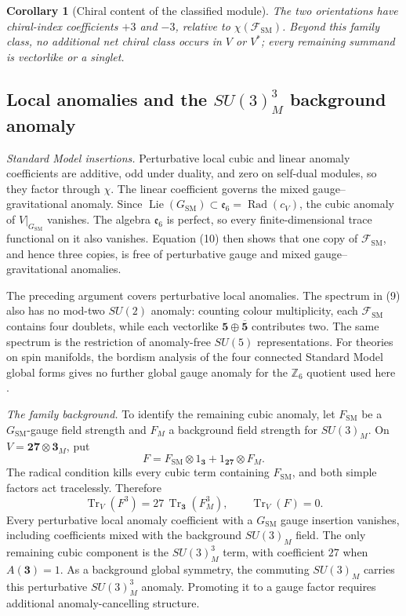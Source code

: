 \documentclass[11pt]{article}
\newtheorem{corollary}[theorem]{Corollary}
\theoremstyle{remark}
\newcommand{\e}{\mathfrak e}
\newcommand{\Tr}{\operatorname{Tr}}
\newcommand{\Rad}{\operatorname{Rad}}
\newcommand{\Ksm}{G_{\mathrm{SM}}}
\begin{document}
\begin{corollary}[Chiral content of the classified module]
\label{cor:chiral-content}
The two orientations have chiral-index coefficients \(+3\) and \(-3\),
relative to \(\chi(\mathcal F_{\mathrm{SM}})\). Beyond this family class, no
additional net chiral class occurs in \(V\) or \(V^*\); every remaining
summand is vectorlike or a singlet.
\end{corollary}


\subsection{Local anomalies and the \texorpdfstring{\(SU(3)_M^3\)}{SU(3)M cubed} background anomaly}

\emph{Standard Model insertions.} Perturbative local cubic and linear anomaly coefficients are additive, odd
under duality, and zero on self-dual modules, so they factor through \(\chi\).
The linear coefficient governs the mixed gauge--gravitational anomaly. Since
\(\operatorname{Lie}(\Ksm)\subset\e_6=\Rad(c_V)\), the cubic anomaly of
\(V|_{\Ksm}\) vanishes. The algebra \(\e_6\) is perfect, so every
finite-dimensional trace functional on it also vanishes. Equation (10) then
shows that one copy of \(\mathcal F_{\mathrm{SM}}\), and hence three copies,
is free of perturbative gauge and mixed gauge--gravitational anomalies.

The preceding argument covers perturbative local anomalies. The spectrum in
(9) also has no mod-two \(SU(2)\) anomaly: counting colour multiplicity, each
\(\mathcal F_{\mathrm{SM}}\) contains four doublets, while each vectorlike
\(\mathbf5\oplus\overline{\mathbf5}\) contributes two. The same spectrum is
the restriction of anomaly-free \(SU(5)\) representations. For theories on spin manifolds, the bordism analysis
of the four connected Standard Model global forms gives no further global
gauge anomaly for the \(\mathbb Z_6\) quotient used here \cite{DavighiGripaiosLohitsiri}.

\medskip
\noindent\emph{The family background.} To identify the remaining cubic anomaly, let \(F_{\mathrm{SM}}\) be a
\(\Ksm\)-gauge field strength and \(F_M\) a background field strength for
\(SU(3)_M\). On
\(V=\mathbf{27}\otimes\mathbf3_M\), put
\[
F=F_{\mathrm{SM}}\otimes1_{\mathbf3}
  +1_{\mathbf{27}}\otimes F_M.
\]
The radical condition kills every cubic term containing \(F_{\mathrm{SM}}\),
and both simple factors act tracelessly. Therefore
\[
\Tr_V(F^3)=27\,\Tr_{\mathbf3}(F_M^3),
\qquad \Tr_V(F)=0. \tag{11}
\]
Every perturbative local anomaly coefficient with a \(\Ksm\) gauge insertion
vanishes, including coefficients mixed with the background \(SU(3)_M\)
field. The only remaining cubic component is the
\(SU(3)_M^3\) term, with coefficient \(27\) when \(A(\mathbf3)=1\).
As a background global symmetry, the commuting \(SU(3)_M\) carries this
perturbative \(SU(3)_M^3\) anomaly.
Promoting it to a gauge factor requires additional anomaly-cancelling structure.
\end{document}
